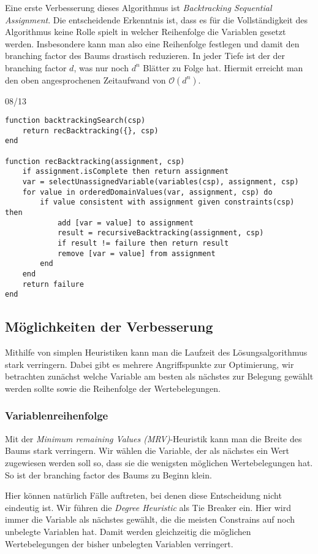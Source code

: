 \documentclass[ngerman]{../LaTeX-Templates/Paper/paper}
\begin{document}
Eine erste Verbesserung dieses Algorithmus ist \emph{Backtracking Sequential Assignment}. Die entscheidende Erkenntnis ist, dass es für die Vollständigkeit des Algorithmus keine Rolle spielt in welcher Reihenfolge die Variablen gesetzt werden.
Insbesondere kann man also eine Reihenfolge festlegen und damit den branching factor des Baums drastisch reduzieren. In jeder Tiefe ist der der branching factor $d$, was nur noch $d^n$ Blätter zu Folge hat.
Hiermit erreicht man den oben angesprochenen Zeitaufwand von $\mathcal O(d^n)$.

08/13
\begin{lstlisting}
function backtrackingSearch(csp)
	return recBacktracking({}, csp)
end

function recBacktracking(assignment, csp)
	if assignment.isComplete then return assignment
	var = selectUnassignedVariable(variables(csp), assignment, csp)
	for value in orderedDomainValues(var, assignment, csp) do
		if value consistent with assignment given constraints(csp) then
			add [var = value] to assignment
			result = recursiveBacktracking(assignment, csp)
			if result != failure then return result
			remove [var = value] from assignment
		end
	end
	return failure
end
\end{lstlisting}

\subsection{Möglichkeiten der Verbesserung}
Mithilfe von simplen Heuristiken kann man die Laufzeit des Lösungsalgorithmus stark verringern. Dabei gibt es mehrere Angriffspunkte zur Optimierung, wir betrachten zunächst welche Variable am besten als nächstes zur Belegung gewählt werden sollte sowie die Reihenfolge der Wertebelegungen.
\subsubsection{Variablenreihenfolge}
Mit der \emph{Minimum remaining Values (MRV)}-Heuristik kann man die Breite des Baums stark verringern. Wir wählen die Variable, der als nächstes ein Wert zugewiesen werden soll so, dass sie die wenigsten möglichen Wertebelegungen hat. So ist der branching factor des Baums zu Beginn klein.

Hier können natürlich Fälle auftreten, bei denen diese Entscheidung nicht eindeutig ist. Wir führen die \emph{Degree Heuristic} als Tie Breaker ein. Hier wird immer die Variable als nächstes gewählt, die die meisten Constrains auf noch unbelegte Variablen hat. Damit werden gleichzeitig die möglichen Wertebelegungen der bisher unbelegten Variablen verringert.
\end{document}
